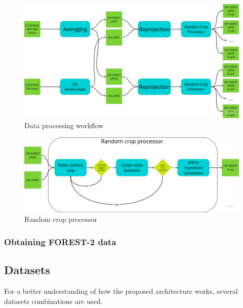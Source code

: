     
        \begin{figure}[h!]
            \centering
            \includegraphics[width=\linewidth]{Includes/5-data_processing_flow_chart.pdf}
            \caption{Data processing workflow}
            \label{fig:5-data_processing_flow_chart}
        \end{figure}

        \begin{figure}[h!]
            \centering
            \includegraphics[width=\linewidth]{Includes/5-random_crop_processor.pdf}
            \caption{Random crop processor}
            \label{fig:5-random_crop_processor}
        \end{figure}

    
        
    \subsubsection{Obtaining FOREST-2 data}


    
    \subsection{Datasets}

        For a better understanding of how the proposed architecture works, several datasets combinations are used.


